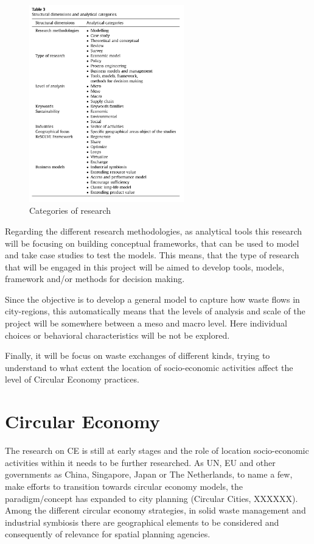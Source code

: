 \begin{figure}[h!]
    \centering
    \includegraphics[width=0.6\textwidth]{sections/asset/cateogories of research.PNG}
    \caption{Categories of research}
    \label{fig:research cat}
\end{figure}

Regarding the different research methodologies, as analytical tools this research will be focusing on building conceptual frameworks, that can be used to model and take case studies to test the models. This means, that the type of research that will be engaged in this project will be aimed to develop tools, models, framework and/or methods for decision making. \par

Since the objective is to develop a general model to capture how waste flows in city-regions, this automatically means that the levels of analysis and scale of the project will be somewhere between a meso and macro level. Here individual choices or behavioral characteristics will be not be explored. \par
Finally, it will be focus on waste exchanges of different kinds, trying to understand to what extent the location of socio-economic activities affect the level of Circular Economy practices. 




\section{Circular Economy}

The research on CE is still at early stages and the role of location socio-economic activities within it needs to be further researched. As UN, EU and other governments as China, Singapore, Japan or The Netherlands, to name a few, make efforts to transition towards circular economy models, the paradigm/concept has expanded to city planning (Circular Cities, XXXXXX). Among the different circular economy strategies, in solid waste management and industrial symbiosis there are geographical elements to be considered and consequently of relevance for spatial planning agencies.\par

